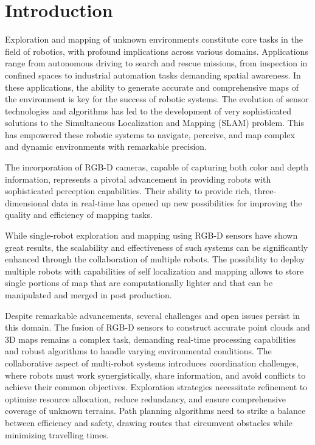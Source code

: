 \section{Introduction}
Exploration and mapping of unknown environments constitute core tasks in the field of robotics, with profound implications across various domains. Applications range from autonomous driving to search and rescue missions, from inspection in confined spaces to industrial automation tasks demanding spatial awareness. In these applications, the ability to generate accurate and comprehensive maps of the environment is key for the success of robotic systems. The evolution of sensor technologies and algorithms has led to the development of very sophisticated solutions to the Simultaneous Localization and Mapping (SLAM) problem. This has empowered these robotic systems to navigate, perceive, and map complex and dynamic environments with remarkable precision. 

The incorporation of RGB-D cameras, capable of capturing both color and depth information, represents a pivotal advancement in providing robots with sophisticated perception capabilities. Their ability to provide rich, three-dimensional data in real-time has opened up new possibilities for improving the quality and efficiency of mapping tasks. 

While single-robot exploration and mapping using RGB-D sensors have shown great results, the scalability and effectiveness of such systems can be significantly enhanced through the collaboration of multiple robots. The possibility to deploy multiple robots with capabilities of self localization and mapping allows to store single portions of map that are computationally lighter and that can be manipulated and merged in post production.

Despite remarkable advancements, several challenges and open issues persist in this domain. The fusion of RGB-D sensors to construct accurate point clouds and 3D maps remains a complex task, demanding real-time processing capabilities and robust algorithms to handle varying environmental conditions. The collaborative aspect of multi-robot systems introduces coordination challenges, where robots must work synergistically, share information, and avoid conflicts to achieve their common objectives. Exploration strategies necessitate refinement to optimize resource allocation, reduce redundancy, and ensure comprehensive coverage of unknown terrains. Path planning algorithms need to strike a balance between efficiency and safety, drawing routes that circumvent obstacles while minimizing travelling times.


